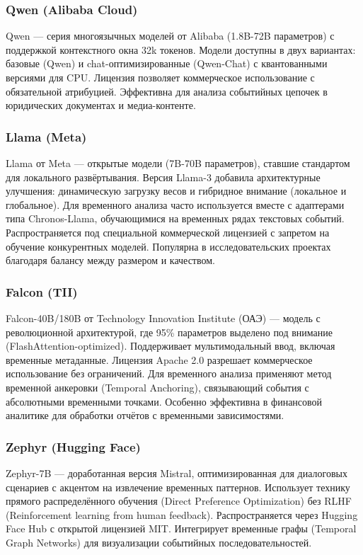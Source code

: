 \subsubsection{Qwen (Alibaba Cloud)}
Qwen \cite{lib:qwen} — серия многоязычных моделей от Alibaba (1.8B-72B параметров) с поддержкой контекстного окна 32k токенов. Модели доступны в двух вариантах: базовые (Qwen) и chat-оптимизированные (Qwen-Chat) с квантованными версиями для CPU. Лицензия позволяет коммерческое использование с обязательной атрибуцией. Эффективна для анализа событийных цепочек в юридических документах и медиа-контенте.

\subsubsection{Llama (Meta)}
Llama \cite{lib:llama} от Meta — открытые модели (7B-70B параметров), ставшие стандартом для локального развёртывания. Версия Llama-3 добавила архитектурные улучшения: динамическую загрузку весов и гибридное внимание (локальное и глобальное). Для временного анализа часто используется вместе с адаптерами типа Chronos-Llama, обучающимися на временных рядах текстовых событий. Распространяется под специальной коммерческой лицензией с запретом на обучение конкурентных моделей. Популярна в исследовательских проектах благодаря балансу между размером и качеством.

\subsubsection{Falcon (TII)}
Falcon-40B/180B \cite{lib:falcon} от Technology Innovation Institute (ОАЭ) — модель с революционной архитектурой, где 95\% параметров выделено под внимание (FlashAttention-optimized). Поддерживает мультимодальный ввод, включая временные метаданные. Лицензия Apache 2.0 разрешает коммерческое использование без ограничений. Для временного анализа применяют метод временной анкеровки (Temporal Anchoring), связывающий события с абсолютными временными точками. Особенно эффективна в финансовой аналитике для обработки отчётов с временными зависимостями.

\subsubsection{Zephyr (Hugging Face)}
Zephyr-7B \cite{lib:Zephyr} — доработанная версия Mistral, оптимизированная для диалоговых сценариев с акцентом на извлечение временных паттернов. Использует технику прямого распределённого обучения (Direct Preference Optimization) без RLHF (Reinforcement learning from human feedback). Распространяется через Hugging Face Hub с открытой лицензией MIT. Интегрирует временные графы (Temporal Graph Networks) для визуализации событийных последовательностей.

